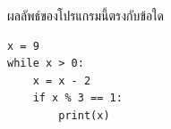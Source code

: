 ﻿%
\question ผลลัพธ์ของโปรแกรมนี้ตรงกับข้อใด
\begin{verbatim}
x = 9
while x > 0:
    x = x - 2
    if x % 3 == 1:
        print(x)
\end{verbatim}
